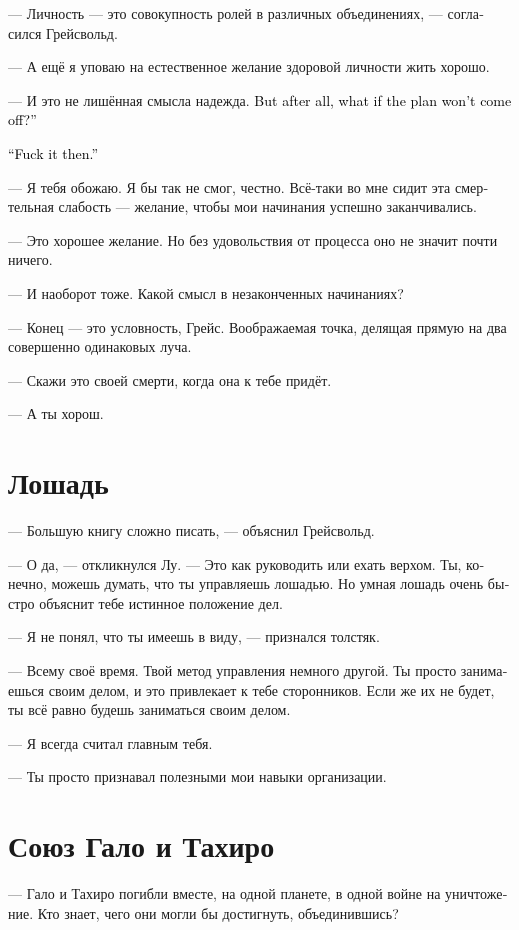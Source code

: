 \documentclass[a4paper,12pt,fleqn]{book}\usepackage{cooltooltips}\usepackage{polyglossia}\setdefaultlanguage[babelshorthands=true]{russian}\setotherlanguage{english}\defaultfontfeatures{Ligatures=TeX,Mapping=tex-text} \usepackage{xcolor}\definecolor{lightgray}{HTML}{bbbbbb}\color{lightgray}\newcommand{\ml}[3]{\textenglish{\textcolor{black}{#3}}}
\begin{document}
{--- Личность --- это совокупность ролей в различных объединениях, --- согласился Грейсвольд.

--- А ещё я уповаю на естественное желание здоровой личности жить хорошо.

--- И это не лишённая смысла надежда.
\ml{$0$}
{Но всё-таки --- что, если не выгорит?}
{But after all, what if the plan won't come off?''}

\ml{$0$}
{--- Ну и чёрт с ним.}
{``Fuck it then.''}

--- Я тебя обожаю.
Я бы так не смог, честно.
Всё-таки во мне сидит эта смертельная слабость --- желание, чтобы мои начинания успешно заканчивались.

--- Это хорошее желание.
Но без удовольствия от процесса оно не значит почти ничего.

--- И наоборот тоже.
Какой смысл в незаконченных начинаниях?

--- Конец --- это условность, Грейс.
Воображаемая точка, делящая прямую на два совершенно одинаковых луча.

--- Скажи это своей смерти, когда она к тебе придёт.

--- А ты хорош.

\section{Лошадь}

--- Большую книгу сложно писать, --- объяснил Грейсвольд.

--- О да, --- откликнулся Лу.
 --- Это как руководить или ехать верхом.
Ты, конечно, можешь думать, что ты управляешь лошадью.
Но умная лошадь очень быстро объяснит тебе истинное положение дел.

--- Я не понял, что ты имеешь в виду, --- признался толстяк.

--- Всему своё время.
Твой метод управления немного другой.
Ты просто занимаешься своим делом, и это привлекает к тебе сторонников.
Если же их не будет, ты всё равно будешь заниматься своим делом.

--- Я всегда считал главным тебя.

--- Ты просто признавал полезными мои навыки организации.

\section{Союз Гало и Тахиро}

--- Гало и Тахиро погибли вместе, на одной планете, в одной войне на уничтожение.
Кто знает, чего они могли бы достигнуть, объединившись?

}
\end{document}
